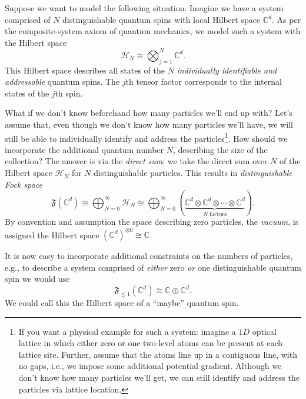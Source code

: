 Suppose we want to model the following situation. Imagine we have a system comprised of $N$ distinguishable quantum spins with local Hilbert space $\mathbb{C}^d$. As per the composite-system axiom of quantum mechanics, we model such a system with the Hilbert space
\begin{equation}
	\mathcal{H}_N \cong \bigotimes_{j=1}^N \mathbb{C}^d.
\end{equation}
This Hilbert space describes all states of the $N$ \emph{individually identifiable and addressable} quantum spins. The $j$th tensor factor corresponds to the internal states of the $j$th spin.

What if we don't know beforehand how many particles we'll end up with? Let's assume that, even though we don't know how many particles we'll have, we will still be able to individually identify and address the particles\footnote{If you want a physical example for such a system: imagine a $1D$ optical lattice in which either zero or one two-level atoms can be present at each lattice site. Further, assume that the atoms line up in a contiguous line, with no gaps, i.e., we impose some additional potential gradient. Although we don't know how many particles we'll get, we can still identify and address the particles via lattice location.}. How should we incorporate the additional quantum number $N$, describing the size of the collection? The answer is via the \emph{direct sum}: we take the direct sum over $N$ of the Hilbert space $\mathcal{H}_N$ for $N$ distinguishable particles. This results in \emph{distinguishable Fock space}
\begin{equation}
	\mathfrak{F}(\mathbb{C}^d) \cong \bigoplus_{N=0}^\infty \mathcal{H}_N\cong \bigoplus_{N=0}^\infty (\underbrace{\mathbb{C}^d\otimes \mathbb{C}^d\otimes \cdots \otimes \mathbb{C}^d}_{\text{$N$ factors}}).
\end{equation}
By convention and assumption the space describing zero particles, the \emph{vacuum}, is assigned the Hilbert space $(\mathbb{C}^d)^{\otimes 0} \cong \mathbb{C}$.

It is now easy to incorporate additional constraints on the numbers of particles, e.g., to describe a system comprised of \emph{either} zero \emph{or} one distinguishable quantum spin we would use
\begin{equation}
	\mathfrak{F}_{\le 1} (\mathbb{C}^d) \cong \mathbb{C}\oplus \mathbb{C}^d.
\end{equation}
We could call this the Hilbert space of a ``maybe'' quantum spin.

